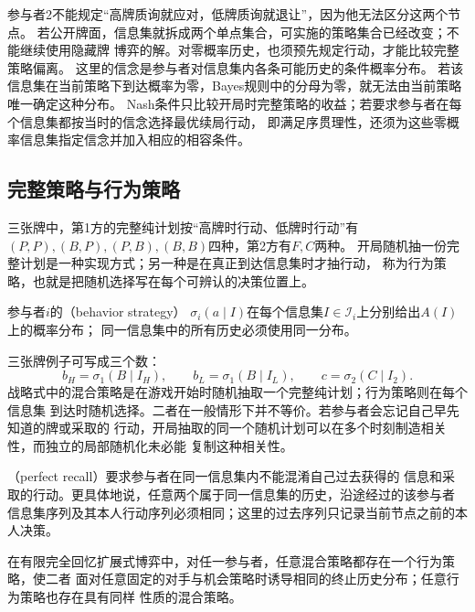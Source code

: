 参与者2不能规定“高牌质询就应对，低牌质询就退让”，因为他无法区分这两个节点。
若公开牌面，信息集就拆成两个单点集合，可实施的策略集合已经改变；不能继续使用隐藏牌
博弈的解。对零概率历史，也须预先规定行动，才能比较完整策略偏离。
这里的信念是参与者对信息集内各条可能历史的条件概率分布。
若该信息集在当前策略下到达概率为零，Bayes规则中的分母为零，就无法由当前策略唯一确定这种分布。
Nash条件只比较开局时完整策略的收益；若要求参与者在每个信息集都按当时的信念选择最优续局行动，
即满足序贯理性，还须为这些零概率信息集指定信念并加入相应的相容条件。

\subsection{完整策略与行为策略}
\label{sec:game-complete-behavior}

三张牌中，第1方的完整纯计划按“高牌时行动、低牌时行动”有
\((P,P),(B,P),(P,B),(B,B)\)四种，第2方有\(F,C\)两种。
开局随机抽一份完整计划是一种实现方式；另一种是在真正到达信息集时才抽行动，
称为行为策略，也就是把随机选择写在每个可辨认的决策位置上。
\begin{definition}[行为策略]
\label{def:game-behavior-strategy}
参与者\(i\)的（behavior strategy）
\(\sigma_i(a\mid I)\)在每个信息集\(I\in\mathcal{I}_i\)上分别给出$A(I)$上的概率分布；
同一信息集中的所有历史必须使用同一分布。
\end{definition}
三张牌例子可写成三个数：
\[
  b_H=\sigma_1(B\mid I_H),\qquad
  b_L=\sigma_1(B\mid I_L),\qquad
  c=\sigma_2(C\mid I_2).
\]
战略式中的混合策略是在游戏开始时随机抽取一个完整纯计划；行为策略则在每个信息集
到达时随机选择。二者在一般情形下并不等价。若参与者会忘记自己早先知道的牌或采取的
行动，开局抽取的同一个随机计划可以在多个时刻制造相关性，而独立的局部随机化未必能
复制这种相关性。

\begin{definition}[完全回忆]
\label{def:game-perfect-recall}
（perfect recall）要求参与者在同一信息集内不能混淆自己过去获得的
信息和采取的行动。更具体地说，任意两个属于同一信息集的历史，沿途经过的该参与者
信息集序列及其本人行动序列必须相同；这里的过去序列只记录当前节点之前的本人决策。
\end{definition}

\begin{theorem}[Kuhn实现等价]
\label{thm:game-kuhn-equivalence}
在有限完全回忆扩展式博弈中，对任一参与者，任意混合策略都存在一个行为策略，使二者
面对任意固定的对手与机会策略时诱导相同的终止历史分布；任意行为策略也存在具有同样
性质的混合策略。
\end{theorem}

